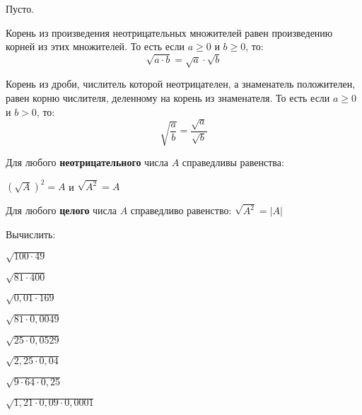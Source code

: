 %
%
\begin{homework}[number=1]
	\begin{listofex}
		\item Пусто.
	\end{listofex}
\end{homework}
%
%
\begin{class}[number=3]
	\begin{definit}
		Корень из произведения неотрицательных множителей равен произведению корней из этих множителей. То есть если \( a\ge0 \) и \( b\ge0 \), то: \[ \sqrt{a \cdot b}=\sqrt{a}\cdot\sqrt{b} \]
	\end{definit}
	\begin{definit}
		Корень из дроби,  числитель которой неотрицателен, а знаменатель положителен, равен корню числителя, деленному на корень из знаменателя. То есть если \( a\ge0 \) и \( b>0 \), то: \[ \sqrt{\dfrac{a}{b}}=\dfrac{\sqrt{a}}{\sqrt{b}} \]
	\end{definit}
	\begin{definit}
		Для любого \textbf{неотрицательного} числа \( A \) справедливы равенства:
		\begin{center}
			\( \left( \sqrt{A} \right)^2=A \) и \( \sqrt{A^2}=A \)
		\end{center}
	\end{definit}
	\begin{definit}
		Для любого \textbf{целого} числа \( A \) справедливо равенство: \( \sqrt{A^2}=|A| \)
	\end{definit}
	\begin{listofex}
		\item Вычислить:
		\begin{enumcols}[itemcolumns=3]
			\item \( \sqrt{100\cdot49} \)
			\item \( \sqrt{81\cdot400} \)
			\item \( \sqrt{0,01\cdot169} \)
			\item \( \sqrt{81\cdot0,0049} \)
			\item \( \sqrt{25\cdot0,0529} \)
			\item \( \sqrt{2,25\cdot0,04} \)
			\item \( \sqrt{9\cdot64\cdot0,25} \)
			\item \( \sqrt{1,21\cdot0,09\cdot0,0001} \)
			

\end{enumcols}
\end{listofex}
\end{class}

